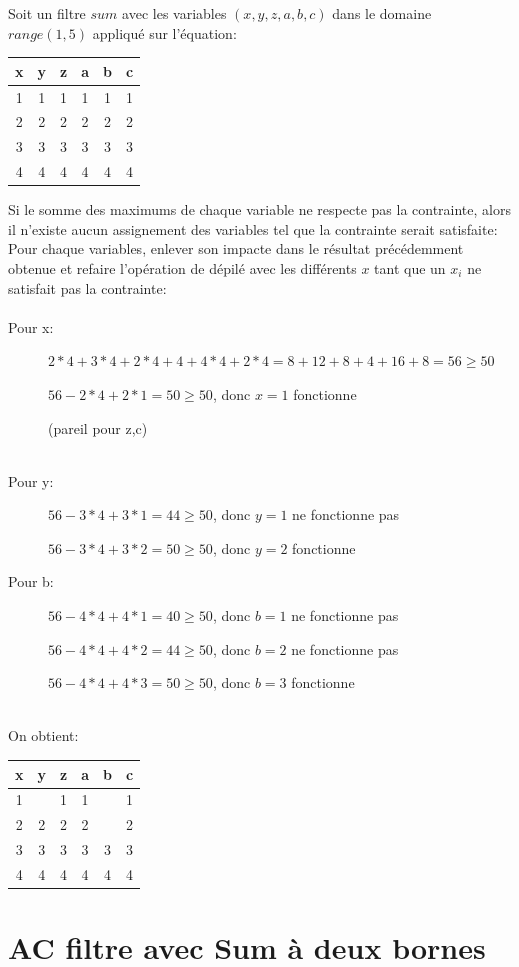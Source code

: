 Soit un filtre $sum$ avec les variables $(x,y,z,a,b,c)$ dans le domaine $range(1,5)$ appliqué sur l'équation:
\begin{center}
\begin{tabular}{cccccc}
x&y&z&a&b&c\\ \hline
1&1&1&1&1&1\\ 2&2&2&2&2&2\\ 3&3&3&3&3&3\\ 4&4&4&4&4&4\\
\end{tabular}
\end{center}
Si le somme des maximums de chaque variable ne respecte pas la contrainte, alors il n'existe aucun assignement des variables tel que la contrainte serait satisfaite:
Pour chaque variables, enlever son impacte dans le résultat précédemment obtenue et refaire l'opération de dépilé avec les différents $x$ tant que un $x_i$ ne satisfait pas la contrainte:\\
\ \\
Pour x:
\begin{description}
\item[] $2*4+3*4+2*4+4+4*4+2*4 = 8+12+8+4+16+8 = 56 \geq 50$
\item[] $ 56 - 2*4 + 2*1 = 50 \geq 50$, donc $x=1$ fonctionne
\item[] (pareil pour z,c)
\end{description}
\ \\
Pour y:
\begin{description}
\item[] $ 56 - 3*4 + 3*1 = 44 \geq 50$, donc $y=1$  ne fonctionne pas
\item[] $ 56 - 3*4 + 3*2 = 50 \geq 50$, donc $y=2$  fonctionne
\end{description}
\pagebreak
Pour b:
\begin{description}
\item[] $ 56 - 4*4 + 4*1 = 40 \geq 50$, donc $b=1$  ne fonctionne pas
\item[] $ 56 - 4*4 + 4*2 = 44 \geq 50$, donc $b=2$  ne fonctionne pas
\item[] $ 56 - 4*4 + 4*3 = 50 \geq 50$, donc $b=3$  fonctionne
\end{description}
\ \\
On obtient:\\
\begin{center}
\begin{tabular}{cccccc}
x&y&z&a&b&c\\ \hline
1&$ $&1&1&$ $&1\\ 2&2&2&2&$ $&2\\ 3&3&3&3&3&3\\ 4&4&4&4&4&4\\
\end{tabular}
\end{center}

\pagebreak
\section{AC filtre avec Sum à deux bornes}

\pagebreak